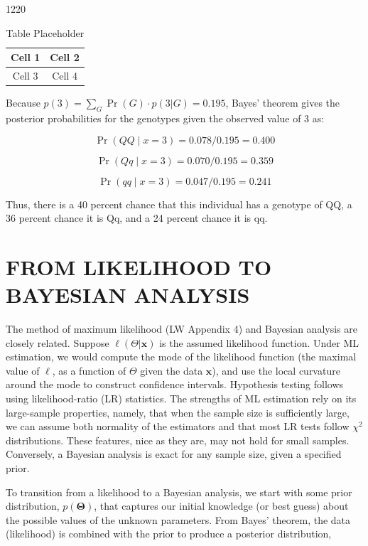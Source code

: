 \documentclass{article}
\begin{document}
1220

\begin{table}[h]
\centering
\begin{tabular}{|c|c|}
\hline
Cell 1 & Cell 2 \\
\hline
Cell 3 & Cell 4 \\
\hline
\end{tabular}
\caption{Table Placeholder}
\end{table}

Because  $ p(3) = \sum_{G} \operatorname{Pr}(G) \cdot p(3|G) = 0.195 $, Bayes' theorem gives the posterior probabilities for the genotypes given the observed value of 3 as:

\begin{equation}
\Pr(QQ\mid x=3)=0.078/0.195=0.400
\end{equation}

\begin{equation}
\Pr(Qq\mid x=3)=0.070/0.195=0.359
\end{equation}

\begin{equation}
\Pr(qq\mid x=3)=0.047/0.195=0.241
\end{equation}

Thus, there is a 40 percent chance that this individual has a genotype of QQ, a 36 percent chance it is Qq, and a 24 percent chance it is qq.

\section{FROM LIKELIHOOD TO BAYESIAN ANALYSIS}
The method of maximum likelihood (LW Appendix 4) and Bayesian analysis are closely related. Suppose  $ \ell(\boldsymbol{\varTheta}|\mathbf{x}) $ is the assumed likelihood function. Under ML estimation, we would compute the mode of the likelihood function (the maximal value of  $ \ell $, as a function of  $ \boldsymbol{\varTheta} $ given the data  $ \mathbf{x} $), and use the local curvature around the mode to construct confidence intervals. Hypothesis testing follows using likelihood-ratio (LR) statistics. The strengths of ML estimation rely on its large-sample properties, namely, that when the sample size is sufficiently large, we can assume both normality of the estimators and that most LR tests follow  $ \chi^{2} $ distributions. These features, nice as they are, may not hold for small samples. Conversely, a Bayesian analysis is exact for any sample size, given a specified prior.

To transition from a likelihood to a Bayesian analysis, we start with some prior distribution,  $ p(\boldsymbol{\Theta}) $, that captures our initial knowledge (or best guess) about the possible values of the unknown parameters. From Bayes' theorem, the data (likelihood) is combined with the prior to produce a posterior distribution,
\end{document}
